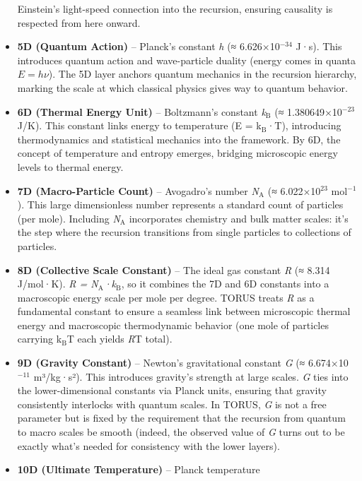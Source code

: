\documentclass[]{article}
\newcommand{\subscript}[1]{\ensuremath{_{\mathrm{#1}}}}
\newcommand{\superscript}[1]{\ensuremath{^{\mathrm{#1}}}}
\begin{document}
\begin{itemize}
  Einstein's light-speed connection into the recursion, ensuring
  causality is respected from here onward.
\item
  \textbf{5D (Quantum Action)} -- Planck's constant \emph{h} (≈
  6.626×10\superscript{−34} J·s)​. This introduces quantum action and
  wave-particle duality (energy comes in quanta $E = h\nu$). The 5D layer
  anchors quantum mechanics in the recursion hierarchy, marking the
  scale at which classical physics gives way to quantum behavior.
\item
  \textbf{6D (Thermal Energy Unit)} -- Boltzmann's constant
  \emph{k\subscript{B}} (≈
  1.380649×10\superscript{−23} J/K)​. This constant links energy to temperature (E
  = k\subscript{B}·T),
  introducing thermodynamics and statistical mechanics into the
  framework. By 6D, the concept of temperature and entropy emerges,
  bridging microscopic energy levels to thermal energy.
\item
  \textbf{7D (Macro-Particle Count)} -- Avogadro's number
  \emph{N\subscript{A}} (≈
  6.022×10\superscript{23} mol\superscript{−1})​. This large dimensionless number represents
  a standard count of particles (per mole). Including
  \emph{N\subscript{A}}
  incorporates chemistry and bulk matter scales: it's the step where the
  recursion transitions from single particles to collections of
  particles.
\item
  \textbf{8D (Collective Scale Constant)} -- The ideal gas constant
  \emph{R} (≈ 8.314 J/mol·K)​. \emph{R =
  N\subscript{A}·k\subscript{B}},
  so it combines the 7D and 6D constants into a macroscopic energy scale
  per mole per degree​. TORUS treats \emph{R} as a fundamental constant
  to ensure a seamless link between microscopic thermal energy and
  macroscopic thermodynamic behavior (one mole of particles carrying
  k\subscript{B}T each
  yields \emph{R}T total)​.
\item
  \textbf{9D (Gravity Constant)} -- Newton's gravitational constant
  \emph{G} (≈ 6.674×10\superscript{−11} m³/kg·s²)​. This introduces gravity's
  strength at large scales. \emph{G} ties into the lower-dimensional
  constants via Planck units, ensuring that gravity consistently
  interlocks with quantum scales​. In TORUS, \emph{G} is not a free
  parameter but is fixed by the requirement that the recursion from
  quantum to macro scales be smooth (indeed, the observed value of
  \emph{G} turns out to be exactly what's needed for consistency with
  the lower layers)​.
\item
  \textbf{10D (Ultimate Temperature)} -- Planck temperature

\end{itemize}
\end{document}
